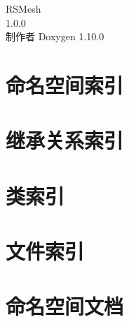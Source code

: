 \documentclass[twoside]{book}
\newcommand{\+}{\discretionary{\mbox{\scriptsize$\hookleftarrow$}}{}{}}
\newcommand{\clearemptydoublepage}{%
    \newpage{\pagestyle{empty}\cleardoublepage}%
  }
\begin{document}
  \raggedbottom
  \begin{CJK}{UTF8}{gbsn}
    \hypersetup{pageanchor=false,
                bookmarksnumbered=true,
                pdfencoding=unicode
               }
  \begin{titlepage}
  \vspace*{7cm}
  \begin{center}%
  {\Large RSMesh}\\
  [1ex]\large 1.\+0.\+0 \\
  \vspace*{1cm}
  {\large 制作者 Doxygen 1.10.0}\\
  \end{center}
  \end{titlepage}
  \clearemptydoublepage
  \tableofcontents
  \clearemptydoublepage
  \hypersetup{pageanchor=true}

\chapter{命名空间索引}

\chapter{继承关系索引}

\chapter{类索引}

\chapter{文件索引}

\chapter{命名空间文档}












\end{CJK}
\end{document}
